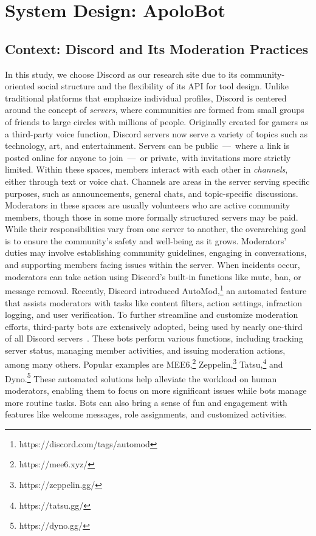 \section{System Design: ApoloBot}
\subsection{Context: Discord and Its Moderation Practices} \label{context}
In this study, we choose Discord as our research site due to its community-oriented social structure and the flexibility of its API for tool design. Unlike traditional platforms that emphasize individual profiles, Discord is centered around the concept of \textit{servers}, where communities are formed from small groups of friends to large circles with millions of people. Originally created for gamers as a third-party voice function, Discord servers now serve a variety of topics such as technology, art, and entertainment. Servers can be public~---~where a link is posted online for anyone to join~---~or private, with invitations more strictly limited. Within these spaces, members interact with each other in \textit{channels}, either through text or voice chat. Channels are areas in the server serving specific purposes, such as announcements, general chats, and topic-specific discussions. Moderators in these spaces are usually volunteers who are active community members, though those in some more formally structured servers may be paid. While their responsibilities vary from one server to another, the overarching goal is to ensure the community's safety and well-being as it grows. Moderators' duties may involve establishing community guidelines, engaging in conversations, and supporting members facing issues within the server. When incidents occur, moderators can take action using Discord's built-in functions like mute, ban, or message removal. Recently, Discord introduced AutoMod,\footnote{https://discord.com/tags/automod} an automated feature that assists moderators with tasks like content filters, action settings, infraction logging, and user verification. To further streamline and customize moderation efforts, third-party bots are extensively adopted, being used by nearly one-third of all Discord servers~\cite{Warren2021}. These bots perform various functions, including tracking server status, managing member activities, and issuing moderation actions, among many others. Popular examples are MEE6,\footnote{https://mee6.xyz/} Zeppelin,\footnote{https://zeppelin.gg/} Tatsu,\footnote{https://tatsu.gg/} and Dyno.\footnote{https://dyno.gg/} These automated solutions help alleviate the workload on human moderators, enabling them to focus on more significant issues while bots manage more routine tasks. Bots can also bring a sense of fun and engagement with features like welcome messages, role assignments, and customized activities. 

